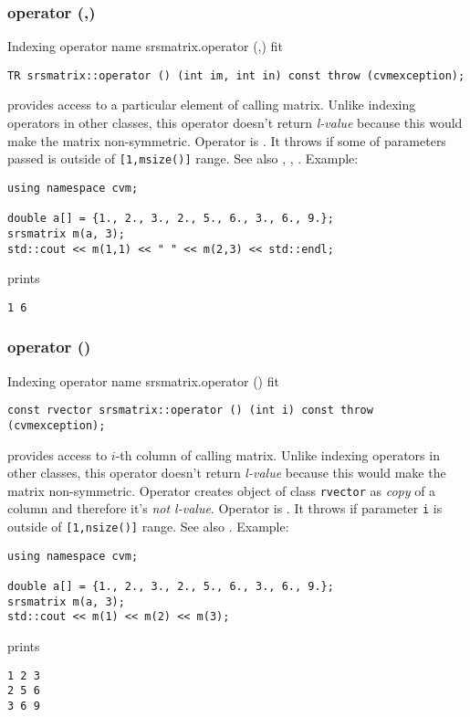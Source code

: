 \subsubsection{operator (,)}
Indexing operator%
\pdfdest name {srsmatrix.operator (,)} fit
\begin{verbatim}
TR srsmatrix::operator () (int im, int in) const throw (cvmexception);
\end{verbatim}
provides access to a particular element of calling matrix. 
Unlike indexing operators in other classes,
this operator doesn't return  \emph{l-value}
because this would make the matrix non-symmetric.
Operator is \Based.
It throws 
if some of parameters passed
is outside of \verb"[1,msize()]" range.
See also ,
,
.
Example:
\begin{Verbatim}
using namespace cvm;

double a[] = {1., 2., 3., 2., 5., 6., 3., 6., 9.};
srsmatrix m(a, 3);
std::cout << m(1,1) << " " << m(2,3) << std::endl;
\end{Verbatim}
prints
\begin{Verbatim}
1 6
\end{Verbatim}
\newpage



\subsubsection{operator ()}
Indexing operator%
\pdfdest name {srsmatrix.operator ()} fit
\begin{verbatim}
const rvector srsmatrix::operator () (int i) const throw (cvmexception);
\end{verbatim}
provides access to \hbox{$i$-th} column of calling matrix.
Unlike indexing operators in other classes,
this operator doesn't return  \emph{l-value}
because this would make the matrix non-symmetric.
Operator creates  object of class \verb"rvector"
as  \emph{copy} of a column and therefore it's
\emph{not  l-value}.
Operator is \Based.
It throws 
if parameter \verb"i" is outside of \verb"[1,nsize()]" range.
See also .
Example:
\begin{Verbatim}
using namespace cvm;

double a[] = {1., 2., 3., 2., 5., 6., 3., 6., 9.};
srsmatrix m(a, 3);
std::cout << m(1) << m(2) << m(3);
\end{Verbatim}
prints
\begin{Verbatim}
1 2 3
2 5 6
3 6 9
\end{Verbatim}
\newpage



